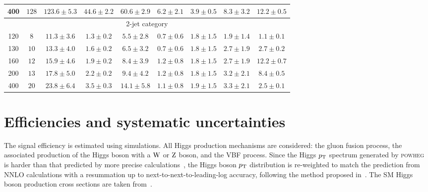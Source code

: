 \documentclass[11pt,twoside,a4paper,cmspaper,final,collab]{cms-tdr}
\begin{document}
\begin{table}[htbp]
\begin{center}
{\begin{tabular} {|c|c|c|c|c|c|c|c|c|}
400 & $128$ & $123.6\pm5.3$  & $44.6\pm2.2$   & $60.6\pm2.9$ & $6.2\pm2.1$  & $3.9\pm0.5$ & $8.3\pm3.2$  & $12.2\pm0.5$ \\ \hline
\multicolumn{9}{|c|}{2-jet category} \\
  \hline
120 & $8$   & $11.3\pm3.6$   & $1.3\pm0.2$    & $5.5\pm2.8$  & $0.7\pm0.6$  & $1.8\pm1.5$ & $1.9\pm1.4$ & $1.1\pm0.1$  \\ \hline
130 & $10$  & $13.3\pm4.0$   & $1.6\pm0.2$    & $6.5\pm3.2$  & $0.7\pm0.6$  & $1.8\pm1.5$ & $2.7\pm1.9$ & $2.7\pm0.2$  \\ \hline
160 & $12$  & $15.9\pm4.6$   & $1.9\pm0.2$    & $8.4\pm3.9$  & $1.2\pm0.8$  & $1.8\pm1.5$ & $2.7\pm1.9$ & $12.2\pm0.7$ \\ \hline
200 & $13$  & $17.8\pm5.0$   & $2.2\pm0.2$    & $9.4\pm4.2$  & $1.2\pm0.8$  & $1.8\pm1.5$ & $3.2\pm2.1$ & $8.4\pm0.5$  \\ \hline
400 & $20$  & $23.8\pm6.4$   & $3.5\pm0.3$    & $14.1\pm5.8$ & $1.1\pm0.8$  & $1.9\pm1.5$ & $3.3\pm2.1$ & $2.5\pm0.1$  \\ \hline
  \end{tabular}
  }
  \end{center}
\end{table}

\section{Efficiencies and systematic uncertainties}
\label{sec:systematics}

The signal efficiency is estimated using simulations.
All Higgs production mechanisms are considered:
the gluon fusion process, the associated production of the Higgs boson with
a $\mathrm{W}$ or $\mathrm{Z}$ boson, and the VBF process. Since the Higgs $p_{\mathrm{T}}$ spectrum generated by
\textsc{powheg} is harder than that predicted by more
precise calculations~\cite{Bozzi:2005wk,deFlorian:2011xf}, the Higgs boson $p_{\mathrm{T}}$ distribution
is re-weighted to match the prediction from NNLO calculations with a resummation up to
next-to-next-to-leading-log accuracy, following the method proposed in~\cite{reweighting}.
The SM Higgs boson production cross sections are taken
from~\cite{LHCHiggsCrossSectionWorkingGroup:2011ti,Dawson:1990zj,Spira:1995rr,Harlander:2002wh,Anastasiou:2002yz,Tackmann:2011,Ravindran:2003um,Catani:2003zt,Actis:2008ug,Anastasiou:2008tj,deFlorian:2009hc,Ciccolini:2007jr,Ciccolini:2007ec,Arnold:2008rz,Brein:2003wg,Ciccolini:2003jy,hdecay2,Denner:2011mq,Bredenstein:2006rh,Bredenstein:2006ha}.
\end{document}

